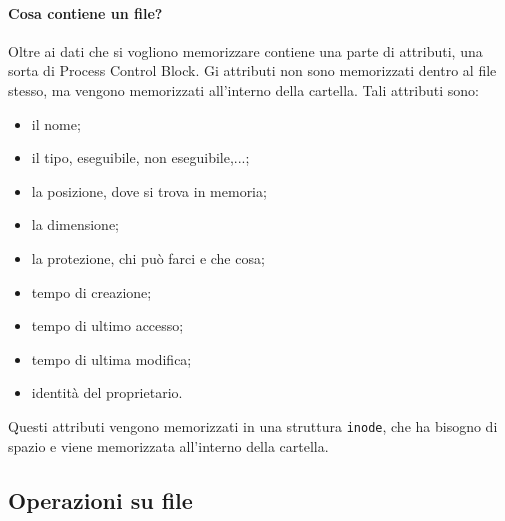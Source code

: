 \documentclass[a4paper, 12pt]{book}
\begin{document}
\paragraph{Cosa contiene un file?} Oltre ai dati 
che si vogliono memorizzare contiene una parte di attributi,
una sorta di Process Control Block. Gi attributi non sono 
memorizzati dentro al file stesso, ma vengono memorizzati 
all'interno della cartella. Tali attributi sono:
\begin{itemize}
    \item il nome;
    \item il tipo, eseguibile, non eseguibile,...;
    \item la posizione, dove si trova in memoria;
    \item la dimensione;
    \item la protezione, chi può farci e che cosa;
    \item tempo di creazione;
    \item tempo di ultimo accesso;
    \item tempo di ultima modifica;
    \item identità del proprietario.
\end{itemize}
Questi attributi vengono memorizzati in una struttura 
\verb|inode|, che ha bisogno di spazio e viene memorizzata 
all'interno della cartella.

\subsection{Operazioni su file}
\end{document}
